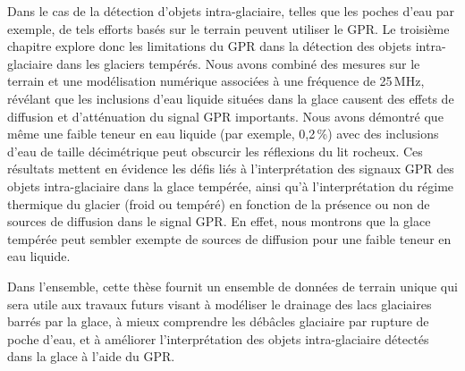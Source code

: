 Dans le cas de la détection d'objets intra-glaciaire, telles que les poches d'eau par exemple, de tels efforts basés sur le terrain peuvent utiliser le GPR. Le troisième chapitre explore donc les limitations du GPR dans la détection des objets intra-glaciaire dans les glaciers tempérés. Nous avons combiné des mesures sur le terrain et une modélisation numérique associées à une fréquence de 25\,MHz, révélant que les inclusions d'eau liquide situées dans la glace causent des effets de diffusion et d'atténuation du signal GPR importants. Nous avons démontré que même une faible teneur en eau liquide (par exemple, 0,2\,\%) avec des inclusions d'eau de taille décimétrique peut obscurcir les réflexions du lit rocheux. Ces résultats mettent en évidence les défis liés à l'interprétation des signaux GPR des objets intra-glaciaire dans la glace tempérée, ainsi qu'à l'interprétation du régime thermique du glacier (froid ou tempéré) en fonction de la présence ou non de sources de diffusion dans le signal GPR. En effet, nous montrons que la glace tempérée peut sembler exempte de sources de diffusion pour une faible teneur en eau liquide.

Dans l'ensemble, cette thèse fournit un ensemble de données de terrain unique qui sera utile aux travaux futurs visant à modéliser le drainage des lacs glaciaires barrés par la glace, à mieux comprendre les débâcles glaciaire par rupture de poche d'eau, et à améliorer l'interprétation des objets intra-glaciaire détectés dans la glace à l'aide du GPR.


\endgroup

\vfill